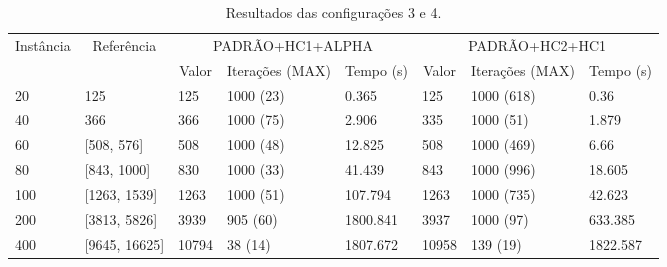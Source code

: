 \documentclass{MO824}
\begin{document}
\begin{table}[htp!]
 \begin{adjustwidth}{-2cm}{}
\centering
\caption{Resultados das configurações 3 e 4.}
\label{table:conf34}
\begin{tabular}{|l|l|l|l|l|l|l|l|}
\hline
\multicolumn{1}{|c|}{\multirow{2}{*}{Instância}} & \multicolumn{1}{|c|}{\multirow{2}{*}{Referência}} & \multicolumn{3}{c|}{PADRÃO+HC1+ALPHA}                                                          & \multicolumn{3}{c|}{PADRÃO+HC2+HC1}                                                            \\ \cline{3-8} 
\multicolumn{1}{|c|}{} & \multicolumn{1}{|c|}{}                          & \multicolumn{1}{c|}{Valor} & \multicolumn{1}{c|}{Iterações (MAX)} & \multicolumn{1}{c|}{Tempo (s)} & \multicolumn{1}{c|}{Valor} & \multicolumn{1}{c|}{Iterações (MAX)} & \multicolumn{1}{c|}{Tempo (s)} \\ \hline
20               & 125                                & 125                        & 1000 (23)                            & 0.365                      & 125                        & 1000 (618)                           & 0.36                       \\ \hline
40               & 366                                 & 366                        & 1000 (75)                            & 2.906                      & 335                        & 1000 (51)                            & 1.879                      \\ \hline
60               & [508, 576]                                & 508                        & 1000 (48)                            & 12.825                     & 508                        & 1000 (469)                           & 6.66                       \\ \hline
80              & [843, 1000]                                 & 830                        & 1000 (33)                            & 41.439                     & 843                        & 1000 (996)                           & 18.605                     \\ \hline
100            & [1263, 1539]                               & 1263                       & 1000 (51)                            & 107.794                    & 1263                       & 1000 (735)                           & 42.623                     \\ \hline
200            & [3813, 5826]                                  & 3939                       & 905 (60)                             & 1800.841                   & 3937                       & 1000 (97)                            & 633.385                    \\ \hline
400            & [9645, 16625]                                 & 10794                      & 38 (14)                              & 1807.672                   & 10958                      & 139 (19)                             & 1822.587                   \\ \hline
\end{tabular}
\end{adjustwidth}
\end{table}
\end{document}
